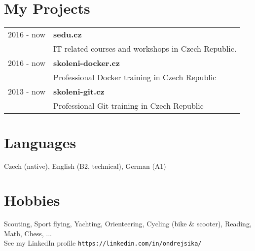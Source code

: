 \documentclass[12pt,a4paper]{article}
\begin{document}
\section*{My Projects}
\begin{tabular}{@{}p{2cm}l}
2016 - now & {\bf sedu.cz}\\
 & IT related courses and workshops in Czech Republic.\\
2016 - now & {\bf skoleni-docker.cz}\\
 & Professional Docker training in Czech Republic\\
2013 - now & {\bf skoleni-git.cz}\\
 & Professional Git training in Czech Republic\\
\end{tabular}


\section*{Languages}
Czech (native), English (B2, technical), German (A1)\\

\section*{Hobbies}
Scouting, Sport flying, Yachting, Orienteering, Cycling (bike \& scooter), Reading, Math, Chess, ...
\\

See my LinkedIn profile \texttt{https://linkedin.com/in/ondrejsika/}
\end{document}
